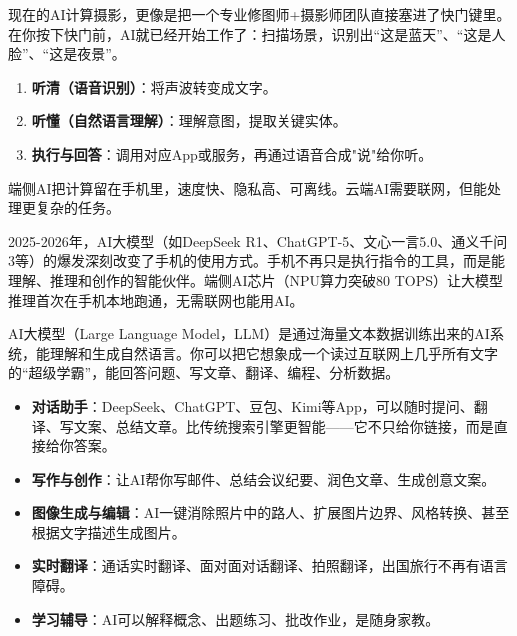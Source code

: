 


现在的AI计算摄影，更像是把一个专业修图师+摄影师团队直接塞进了快门键里。在你按下快门前，AI就已经开始工作了：扫描场景，识别出“这是蓝天”、“这是人脸”、“这是夜景”。


\begin{enumerate}
  \item \textbf{听清（语音识别）}：将声波转变成文字。
  \item \textbf{听懂（自然语言理解）}：理解意图，提取关键实体。
  \item \textbf{执行与回答}：调用对应App或服务，再通过语音合成"说"给你听。
\end{enumerate}


端侧AI把计算留在手机里，速度快、隐私高、可离线。云端AI需要联网，但能处理更复杂的任务。


2025-2026年，AI大模型（如DeepSeek R1、ChatGPT-5、文心一言5.0、通义千问3等）的爆发深刻改变了手机的使用方式。手机不再只是执行指令的工具，而是能理解、推理和创作的智能伙伴。端侧AI芯片（NPU算力突破80 TOPS）让大模型推理首次在手机本地跑通，无需联网也能用AI。


AI大模型（Large Language Model，LLM）是通过海量文本数据训练出来的AI系统，能理解和生成自然语言。你可以把它想象成一个读过互联网上几乎所有文字的“超级学霸”，能回答问题、写文章、翻译、编程、分析数据。


\begin{itemize}
  \item \textbf{对话助手}：DeepSeek、ChatGPT、豆包、Kimi等App，可以随时提问、翻译、写文案、总结文章。比传统搜索引擎更智能——它不只给你链接，而是直接给你答案。
  \item \textbf{写作与创作}：让AI帮你写邮件、总结会议纪要、润色文章、生成创意文案。
  \item \textbf{图像生成与编辑}：AI一键消除照片中的路人、扩展图片边界、风格转换、甚至根据文字描述生成图片。
  \item \textbf{实时翻译}：通话实时翻译、面对面对话翻译、拍照翻译，出国旅行不再有语言障碍。
  \item \textbf{学习辅导}：AI可以解释概念、出题练习、批改作业，是随身家教。
\end{itemize}

